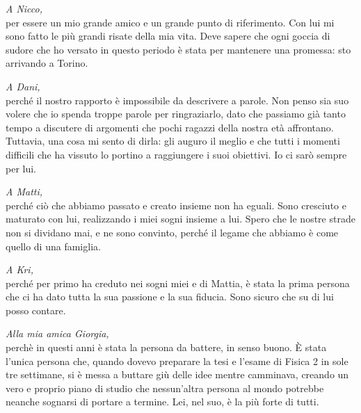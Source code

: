 \documentclass[twoside]{article}
\begin{document}
\vspace{\baselineskip}

\textit{A Nicco,}\\
per essere un mio grande amico e un grande punto di riferimento. Con lui mi sono fatto le più grandi risate della mia vita. Deve sapere che ogni goccia di sudore che ho versato in questo periodo è stata per mantenere una promessa: sto arrivando a Torino.

\vspace{\baselineskip}

\textit{A Dani,}\\
perché il nostro rapporto è impossibile da descrivere a parole. Non penso sia suo volere che io spenda troppe parole per ringraziarlo, dato che passiamo già tanto tempo a discutere di argomenti che pochi ragazzi della nostra età affrontano. Tuttavia, una cosa mi sento di dirla: gli auguro il meglio e che tutti i momenti difficili che ha vissuto lo portino a raggiungere i suoi obiettivi. Io ci sarò sempre per lui.

\vspace{\baselineskip}

\textit{A Matti,}\\
perché ciò che abbiamo passato e creato insieme non ha eguali. Sono cresciuto e maturato con lui, realizzando i miei sogni insieme a lui. Spero che le nostre strade non si dividano mai, e ne sono convinto, perché il legame che abbiamo è come quello di una famiglia.

\vspace{\baselineskip}

\textit{A Kri,}\\
perché per primo ha creduto nei sogni miei e di Mattia, è stata la prima persona che ci ha dato tutta la sua passione e la sua fiducia. Sono sicuro che su di lui posso contare.

\vspace{\baselineskip}

\textit{Alla mia amica Giorgia,}\\
perchè in questi anni è stata la persona da battere, in senso buono. È stata l'unica persona che, quando dovevo preparare la tesi e l'esame di Fisica 2 in sole tre settimane, si è messa a buttare giù delle idee mentre camminava, creando un vero e proprio piano di studio che nessun'altra persona al mondo potrebbe neanche sognarsi di portare a termine. Lei, nel suo, è la più forte di tutti.

\vspace{\baselineskip}
\end{document}
